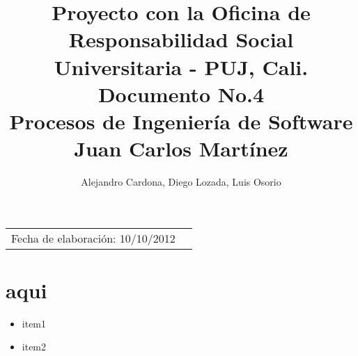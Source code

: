 \documentclass{article}
\title{Proyecto con la Oficina de Responsabilidad Social Universitaria - PUJ, Cali. \\ Documento No.4\\ Procesos de Ingenier\'ia de Software \\ Juan Carlos Mart\'inez \\ } %
\author{Alejandro Cardona, Diego Lozada, Luis Osorio} %
\begin{document}
\maketitle %

\begin{tabular}{lr}
Fecha de elaboraci\'on: 10/10/2012 %
\end{tabular}

\setlength\parindent{0pt} %

\section{aqui} %


\begin{itemize}
\item item1
\item item2
\end{itemize}
\end{document}
